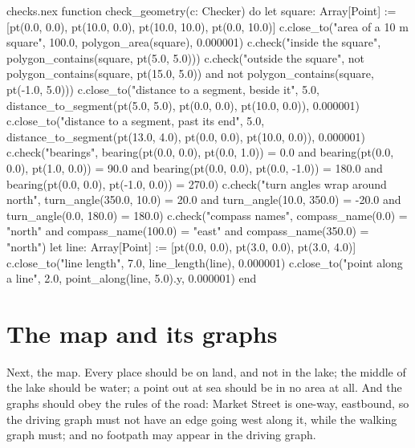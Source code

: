 \begin{append}{checks.nex}
function check_geometry(c: Checker) do
  let square: Array[Point] := [pt(0.0, 0.0), pt(10.0, 0.0), pt(10.0, 10.0), pt(0.0, 10.0)]
  c.close_to("area of a 10 m square", 100.0, polygon_area(square), 0.000001)
  c.check("inside the square", polygon_contains(square, pt(5.0, 5.0)))
  c.check("outside the square", not polygon_contains(square, pt(15.0, 5.0))
    and not polygon_contains(square, pt(-1.0, 5.0)))
  c.close_to("distance to a segment, beside it", 5.0,
    distance_to_segment(pt(5.0, 5.0), pt(0.0, 0.0), pt(10.0, 0.0)), 0.000001)
  c.close_to("distance to a segment, past its end", 5.0,
    distance_to_segment(pt(13.0, 4.0), pt(0.0, 0.0), pt(10.0, 0.0)), 0.000001)
  c.check("bearings", bearing(pt(0.0, 0.0), pt(0.0, 1.0)) = 0.0
    and bearing(pt(0.0, 0.0), pt(1.0, 0.0)) = 90.0
    and bearing(pt(0.0, 0.0), pt(0.0, -1.0)) = 180.0
    and bearing(pt(0.0, 0.0), pt(-1.0, 0.0)) = 270.0)
  c.check("turn angles wrap around north", turn_angle(350.0, 10.0) = 20.0
    and turn_angle(10.0, 350.0) = -20.0 and turn_angle(0.0, 180.0) = 180.0)
  c.check("compass names", compass_name(0.0) = "north" and compass_name(100.0) = "east"
    and compass_name(350.0) = "north")
  let line: Array[Point] := [pt(0.0, 0.0), pt(3.0, 0.0), pt(3.0, 4.0)]
  c.close_to("line length", 7.0, line_length(line), 0.000001)
  c.close_to("point along a line", 2.0, point_along(line, 5.0).y, 0.000001)
end
\end{append}

\section{The map and its graphs}

Next, the map. Every place should be on land, and not in the lake; the
middle of the lake should be water; a point out at sea should be in no
area at all. And the graphs should obey the rules of the road: Market
Street is one-way, eastbound, so the driving graph must not have an edge
going west along it, while the walking graph must; and no footpath may
appear in the driving graph.

